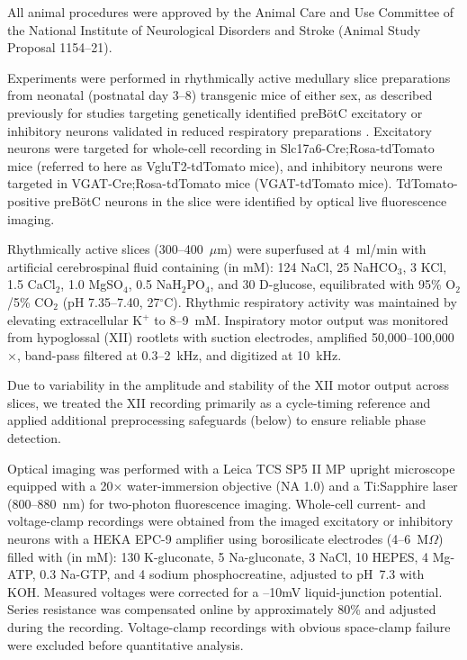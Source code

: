 \documentclass[
]{article}
\begin{document}
All animal procedures were approved by the Animal Care and Use Committee of the National Institute of Neurological Disorders and Stroke (Animal Study Proposal 1154--21).

Experiments were performed in rhythmically active medullary slice preparations from neonatal (postnatal day 3--8) transgenic mice of either sex, as described previously for studies targeting genetically identified preBötC excitatory or inhibitory neurons validated in reduced respiratory preparations \citep{koizumi2013structural,ausborn2018organization}. Excitatory neurons were targeted for whole-cell recording in Slc17a6-Cre;Rosa-tdTomato mice (referred to here as VgluT2-tdTomato mice), and inhibitory neurons were targeted in VGAT-Cre;Rosa-tdTomato mice (VGAT-tdTomato mice). TdTomato-positive preBötC neurons in the slice were identified by optical live fluorescence imaging.

Rhythmically active slices (300--400~\(\mu\)m) were superfused at 4~ml/min with artificial cerebrospinal fluid containing (in mM): 124 NaCl, 25 NaHCO\(_{3}\), 3 KCl, 1.5 CaCl\(_{2}\), 1.0 MgSO\(_{4}\), 0.5 NaH\(_{2}\)PO\(_{4}\), and 30 D-glucose, equilibrated with 95\% O\(_{2}\)/5\% CO\(_{2}\) (pH 7.35--7.40, 27\(^{\circ}\)C). Rhythmic respiratory activity was maintained by elevating extracellular K\(^{+}\) to 8--9~mM. Inspiratory motor output was monitored from hypoglossal (XII) rootlets with suction electrodes, amplified 50,000--100,000\(\times\), band-pass filtered at 0.3--2~kHz, and digitized at 10~kHz.

Due to variability in the amplitude and stability of the XII motor output across slices, we treated the XII recording primarily as a cycle-timing reference and applied additional preprocessing safeguards (below) to ensure reliable phase detection.

Optical imaging was performed with a Leica TCS SP5 II MP upright microscope equipped with a 20\(\times\) water-immersion objective (NA 1.0) and a Ti:Sapphire laser (800--880~nm) for two-photon fluorescence imaging. Whole-cell current- and voltage-clamp recordings were obtained from the imaged excitatory or inhibitory neurons with a HEKA EPC-9 amplifier using borosilicate electrodes (4--6~M\(\Omega\)) filled with (in mM): 130 K-gluconate, 5 Na-gluconate, 3 NaCl, 10 HEPES, 4 Mg-ATP, 0.3 Na-GTP, and 4 sodium phosphocreatine, adjusted to pH~7.3 with KOH. Measured voltages were corrected for a --10mV liquid-junction potential. Series resistance was compensated online by approximately 80\% and adjusted during the recording. Voltage-clamp recordings with obvious space-clamp failure were excluded before quantitative analysis.
\end{document}
